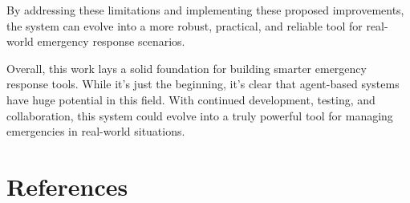 \documentclass[a4paper]{article}
\begin{document}
By addressing these limitations and implementing these proposed improvements, the system can evolve into a more robust, practical, and reliable
 tool for real-world emergency response scenarios.

 Overall, this work lays a solid foundation for building smarter emergency response tools. While it’s just the beginning, it’s clear that
  agent-based systems have huge potential in this field. With continued development, testing, and collaboration, this system could evolve 
  into a truly powerful tool for managing emergencies in real-world situations.


\section{References}
% 
% 
\end{document}
